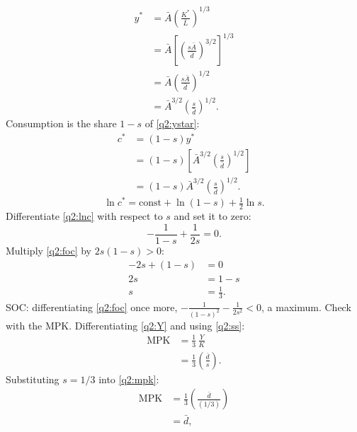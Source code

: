 \begin{sol}
\begin{align}
y^\ast &= \bar A\left(\frac{K^\ast}{\bar L}\right)^{1/3}\nonumber\\
&= \bar A\left[\left(\frac{s\bar A}{\bar d}\right)^{3/2}\right]^{1/3}\nonumber\\
&= \bar A\left(\frac{s\bar A}{\bar d}\right)^{1/2}\nonumber\\
&= \bar A^{3/2}\left(\frac{s}{\bar d}\right)^{1/2}. \label{q2:ystar}
\end{align}
Consumption is the share $1-s$ of \eqref{q2:ystar}:
\begin{align}
c^\ast &= (1-s)y^\ast\nonumber\\
&= (1-s)\left[\bar A^{3/2}\left(\frac{s}{\bar d}\right)^{1/2}\right]\nonumber\\
&= (1-s)\bar A^{3/2}\left(\frac{s}{\bar d}\right)^{1/2}. \label{q2:cstar}
\end{align}
\begin{equation}
\ln c^\ast=\text{const}+\ln(1-s)+\tfrac12\ln s. \label{q2:lnc}
\end{equation}
Differentiate \eqref{q2:lnc} with respect to $s$ and set it to zero:
\begin{equation}
-\frac1{1-s}+\frac1{2s}=0. \label{q2:foc}
\end{equation}
Multiply \eqref{q2:foc} by $2s(1-s)>0$:
\begin{align*}
-2s+(1-s) &= 0\\
2s &= 1-s\\
s &= \tfrac13 .
\end{align*}
SOC: differentiating \eqref{q2:foc} once more, $-\frac1{(1-s)^2}-\frac1{2s^2}<0$, a maximum.
Check with the MPK. Differentiating \eqref{q2:Y} and using \eqref{q2:ss}:
\begin{align}
\text{MPK} &= \frac13\,\frac{Y}{K}\nonumber\\
&= \frac13\left(\frac{\bar d}{s}\right). \label{q2:mpk}
\end{align}
Substituting $s=1/3$ into \eqref{q2:mpk}:
\begin{align*}
\text{MPK} &= \frac13\left(\frac{\bar d}{(1/3)}\right)\\
&= \bar d,
\end{align*}

\end{sol}
